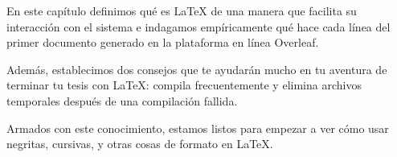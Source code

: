 En este capítulo definimos qué es \LaTeX{} de una manera que facilita su interacción con el sistema e indagamos empíricamente qué hace cada línea del primer documento generado en la plataforma en línea Overleaf.

Además, establecimos dos consejos que te ayudarán mucho en tu aventura de terminar tu tesis con \LaTeX{}: compila frecuentemente y elimina archivos temporales después de una compilación fallida.

Armados con este conocimiento, estamos listos para empezar a ver cómo usar negritas, cursivas, y otras cosas de formato en \LaTeX{}.